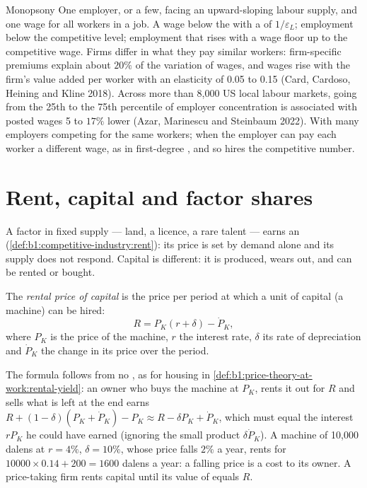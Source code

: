 \begin{model}{Monopsony}
\assumes One employer, or a few, facing an upward-sloping labour supply,
and one wage for all workers in a job.
\predicts A wage below the  with a  of
$1/\varepsilon_L$; employment below the competitive level; employment that rises with
a wage floor up to the competitive wage.
\tested Firms differ in what they pay similar workers: firm-specific
premiums explain about $20\%$ of the variation of wages, and wages rise
with the firm's value added per worker with an elasticity of 0.05 to 0.15
(Card, Cardoso, Heining and Kline 2018). %
Across more than 8,000 US local labour markets, going from the 25th to the
75th percentile of employer concentration is associated with posted wages
5 to $17\%$ lower (Azar, Marinescu and Steinbaum 2022). %
\breaks With many employers competing for the same workers; when the
employer can pay each worker a different wage, as in first-degree , and so hires the competitive number.
\end{model}

\section{Rent, capital and factor shares}\label{sec:b1:factor-markets:rent}

A factor in fixed supply --- land, a licence, a rare talent --- earns an
 (\cref{def:b1:competitive-industry:rent}): its price is set
by demand alone and its supply does not respond. Capital is different: it
is produced, wears out, and can be rented or bought.

\begin{definition}\label{def:b1:factor-markets:rental-price}
The \emph{rental price of capital} is the price per period at which a unit
of capital (a machine) can be hired:
\[
R = P_K(r + \delta) - \dot P_K,
\]
where $P_K$ is the price of the machine, $r$ the interest rate, $\delta$ its rate of
depreciation and $\dot P_K$ the change in its price over the period.
\end{definition}

The formula follows from no , as for housing in
\cref{def:b1:price-theory-at-work:rental-yield}: an owner who buys the
machine at $P_K$, rents it out for $R$ and sells what is left at the end
earns $R + (1 - \delta)(P_K + \dot P_K) - P_K \approx R - \delta P_K + \dot P_K$, which must equal the interest $rP_K$
he could have earned (ignoring the small product $\delta\dot P_K$). A machine of
10,000 dalens at $r = 4\%$, $\delta = 10\%$, whose price falls $2\%$ a year, rents for
$10000 \times 0.14 + 200 = 1600$ dalens a year: a falling price is a cost to its owner.
A price-taking firm rents capital until its value of 
equals $R$.

